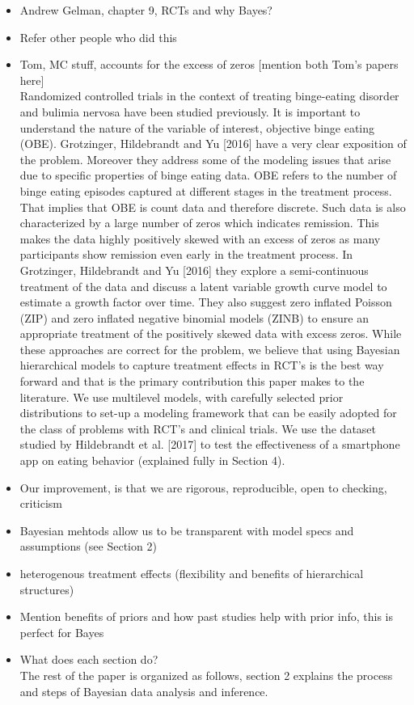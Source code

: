 \documentclass[12pt, oneside]{article}
\begin{document}
\begin{itemize}
\item Andrew Gelman, chapter 9, RCTs and why Bayes?

\item Refer other people who did this
\item Tom, MC stuff, accounts for the excess of zeros [mention both Tom's papers here]\\
Randomized controlled trials in the context of treating binge-eating disorder and bulimia nervosa have been studied previously. It is important to understand the nature of the variable of interest, objective binge eating (OBE). Grotzinger, Hildebrandt and Yu [2016] have a very clear exposition of the problem. Moreover they address some of the modeling issues that arise due to specific properties of binge eating data. OBE refers to the number of binge eating episodes captured at different stages in the treatment process. That implies that OBE is count data and therefore discrete. Such data is also characterized by a large number of zeros which indicates remission. This makes the data highly positively skewed with an excess of zeros as many participants show remission even early in the treatment process. In Grotzinger, Hildebrandt and Yu [2016] they explore a semi-continuous treatment of the data and discuss a latent variable growth curve model to estimate a growth factor over time. They also suggest zero inflated Poisson (ZIP) and zero inflated negative binomial models (ZINB) to ensure an  appropriate treatment of the positively skewed data with excess zeros. While these approaches are correct for the problem, we believe that using Bayesian hierarchical models to capture treatment effects in RCT's is the best way forward and that is the primary contribution this paper makes to the literature. We use multilevel models, with carefully selected prior distributions to set-up a modeling framework that can be easily adopted for the class of problems with RCT's and clinical trials. We use the dataset studied by Hildebrandt et al. [2017] to test the effectiveness of a smartphone app on eating behavior (explained fully in Section 4).





\item Our improvement, is that we are rigorous, reproducible, open to checking, criticism
\item Bayesian mehtods allow us to be transparent with model specs and assumptions (see Section 2)
\item heterogenous treatment effects (flexibility and benefits of hierarchical structures)
\item Mention benefits of priors and how past studies help with prior info, this is perfect for Bayes
\item What does each section do?\\
The rest of the paper is organized as follows, section 2 explains the process and steps of Bayesian data analysis and inference. 

\end{itemize}
\end{document}
